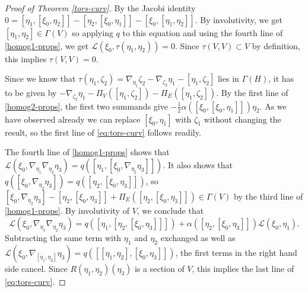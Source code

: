 \documentclass[11pt]{amsart}
\numberwithin{proposition}{section}
\numberwithin{equation}{section}
\begin{document}
\begin{proof}[Proof of Theorem \ref{tors-curv}]
    By the Jacobi identity $0=[\eta_1,[\xi_0,\eta_2]]-[\eta_2,[\xi_0,\eta_1]]-[\xi_0,[\eta_1,\eta_2]]$. By involutivity, we get $[\eta_1,\eta_2]\in\Gamma(V)$ so applying $q$ to this equation and using the fourth line of \eqref{homog1-props}, we get $\mathcal L(\xi_0,\tau(\eta_1,\eta_2))=0$. Since $\tau(V,V)\subset V$ by definition, this implies $\tau(V,V)=0$. 
    
    Since we know that $\tau(\eta_1,\zeta_2)=\nabla_{\eta_1}\zeta_2-\nabla_{\zeta_2}\eta_1-[\eta_1,\zeta_2]$ lies in $\Gamma(H)$, it has to be given by $-\nabla_{\zeta_2}\eta_1-\Pi_V([\eta_1,\zeta_2])-\Pi_E([\eta_1,\zeta_2])$. By the first line of \eqref{homog2-props}, the first two summands give $-\tfrac12\alpha([\xi_0,[\xi_0,\eta_1]])\eta_2$. As we have observed already we can replace $[\xi_0,\eta_1]$ with $\zeta_1$ without changing the result, so the first line of \eqref{eq:tors-curv} follows readily. 

    The fourth line of \eqref{homog1-props} shows that  
    $\mathcal L(\xi_0,\nabla_{\eta_1}\nabla_{\eta_2}\eta_3)=q([\eta_1,[\xi_0,\nabla_{\eta_2}\eta_3]])$.
    It also shows that $q([\xi_0,\nabla_{\eta_2}\eta_3])=q([\eta_2,[\xi_0,\eta_3]])$, so $[\xi_0,\nabla_{\eta_2}\eta_3]-[\eta_2,[\xi_0,\eta_3]]+\Pi_E([\eta_2,[\xi_0,\eta_3]])\in\Gamma(V)$ by the third line of \eqref{homog1-props}. By involutivity of $V$, we conclude that
    $$
    \mathcal L(\xi_0,\nabla_{\eta_1}\nabla_{\eta_2}\eta_3)=q([\eta_1,[\eta_2,[\xi_0,\eta_3]]]) + \alpha([\eta_2,[\xi_0,\eta_3]])\mathcal L(\xi_0,\eta_1). 
    $$
    Subtracting the same term with $\eta_1$ and $\eta_2$ exchanged as well as $\mathcal L(\xi_0,\nabla_{[\eta_1,\eta_2]}\eta_3)=q([[\eta_1,\eta_2],[\xi_0,\eta_3]])$, the first terms in the right hand side cancel. Since $R(\eta_1,\eta_2)(\eta_3)$ is a section of $V$, this implies the last line of \eqref{eq:tors-curv}. 


\end{proof}
\end{document}
